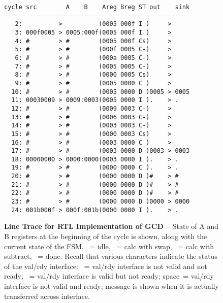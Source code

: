 
\begin{figure}

  \begin{minipage}[t]{0.55\tw}
  \footnotesize
  \begin{Verbatim}
cycle src        A    B    Areg Breg ST out    sink
---------------------------------------------------
   2:          >          (0005 000f I )     >
   3: 000f0005 > 0005:000f(0005 000f I )     >
   4: #        > #        (0005 000f Cs)     >
   5: #        > #        (000f 0005 C-)     >
   6: #        > #        (000a 0005 C-)     >
   7: #        > #        (0005 0005 C-)     >
   8: #        > #        (0000 0005 Cs)     >
   9: #        > #        (0005 0000 C )     >
  10: #        > #        (0005 0000 D )0005 > 0005
  11: 00030009 > 0009:0003(0005 0000 I ).    > .
  12: #        > #        (0009 0003 C-)     >
  13: #        > #        (0006 0003 C-)     >
  14: #        > #        (0003 0003 C-)     >
  15: #        > #        (0000 0003 Cs)     >
  16: #        > #        (0003 0000 C )     >
  17: #        > #        (0003 0000 D )0003 > 0003
  18: 00000000 > 0000:0000(0003 0000 I ).    > .
  19: #        > #        (0000 0000 C ).    > .
  20: #        > #        (0000 0000 D )#    > #
  21: #        > #        (0000 0000 D )#    > #
  22: #        > #        (0000 0000 D )#    > #
  23: #        > #        (0000 0000 D )0000 > 0000
  24: 001b000f > 000f:001b(0000 0000 I ).    > .
  \end{Verbatim}
  \end{minipage}%
  \hfill%
  \begin{minipage}[t]{0.42\tw}
  \caption{\textbf{Line Trace for RTL Implementation of GCD --} State of
    A and B registers at the beginning of the cycle is shown, along with
    the current state of the FSM. ~= idle, ~= calc with
    swap, ~= calc with subtract, ~= done. Recall that
    various characters indicate the status of the val/rdy interface:
    ~= val/rdy interface is not valid and not ready; \TT{\#}~=
    val/rdy interface is valid but not ready; space~= val/rdy interface
    is not valid and ready; message is shown when it is actually
    transferred across interface.}
  \label{fig-tut3-gcd-rtl-linetrace}
  \end{minipage}
  \hspace*{0.1in}\mbox{}

\end{figure}

